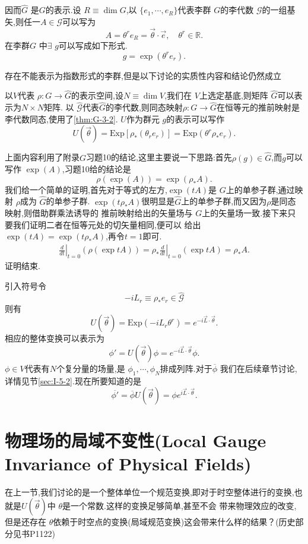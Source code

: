 \documentclass[../main.tex]{subfiles}
\begin{document}
 因而$\hat{G}$ 是$G$的表示.设 $R \equiv \dim{G}$,以 $\{e_1, \cdots ,e_R\}$代表李群 $G$的李代数 $\mathscr{G}$的一组基矢,则任一$A \in \mathscr{G}$可以写为
 \[
   A = \theta^r e_R = \vec{\theta}\cdot \vec{e}, \quad \theta^r \in \mathbb{R} 
 .\] 
 在李群$G$ 中$\exists $ $g$可以写成如下形式.
 \[
   g = \exp{(\theta^re_r)}
 .\]
 \begin{remark}
   存在不能表示为指数形式的李群,但是以下讨论的实质性内容和结论仍然成立
 \end{remark}
 以$V$代表 $\rho: G\to \hat{G}$的表示空间,设$N \equiv \dim{V}$,我们在 $V$上选定基底,则矩阵 $\hat{G}$可以表示为$N \times N$矩阵.
 以 $\hat{\mathscr{G}}$代表$\hat{G}$的李代数,则同态映射$\rho:G \to \hat{G}$在恒等元的推前映射是李代数同态,使用了\ref{thm:G-3-2}.
 $U$作为群元 $g$的表示可以写作 \[
   U(\vec{\theta}) = \text{Exp}[\rho_*(\theta_r e_r)] = \text{Exp}(\theta^r \rho_* e_r)
 .\] 
 \begin{note}
   上面内容利用了附录$G$习题10的结论,这里主要说一下思路:首先$\rho(g) \in \hat{G}$,而$g$可以写作 $\exp(A)$,习题10给的结论是\[
     \rho(\exp{(A)}) = \exp{(\rho_*A)}
   .\] 
   我们给一个简单的证明,首先对于等式的左方,$\exp{(tA)}$是 $G$上的单参子群,通过映射 $\rho$成为 $\hat{G}$的单参子群.
   $\exp{(t\rho_*A)}$很明显是$ \hat{G}$上的单参子群,而又因为$\rho$是同态映射,则借助群乘法诱导的
   推前映射给出的矢量场与 $G$上的矢量场一致.接下来只要我们证明二者在恒等元处的切矢量相同,便可以
   给出 $\exp{(tA)}=\exp{(t\rho_*A)}$,再令$t = 1$即可.
    \begin{align*}
      \left.\frac{d}{dt}\right|_{t = 0} (\rho(\exp{tA})) = \rho_* \left.\frac{d}{dt}\right|_{t = 0} (\exp{tA}) = \rho_* A 
   .\end{align*}
   证明结束.
 \end{note}
 引入符号令
 \begin{equation}
-i L_r \equiv \rho_* e_r \in \hat{\mathscr{G}} 
\label{eq:I-4-3}
 \end{equation}
  则有\[
 U(\vec{\theta}) = \text{Exp}(-iL_r \theta^r) = e^{-i \vec{L}\cdot \vec{\theta}} 
 .\] 
 相应的整体变换可以表示为\[
 \phi' = U(\vec{\theta})\phi = e^{-i \vec{L} \cdot \vec{\theta}}\phi
 .\] $\phi \in V$代表有$N$个复分量的场量,是 $\phi_1,\cdots,\phi_N$排成列阵.对于$\overline{\phi}$ 我们在后续章节讨论,详情见节\ref{sec:I-5-2}.现在所要知道的是\[
 \overline{\phi'} = \overline{\phi} U(\vec{\theta}) = \phi e^{i \vec{L} \cdot \vec{\theta}}
 .\] 
 \chapter{物理场的局域不变性(Local Gauge Invariance of Physical Fields)}
 在上一节,我们讨论的是一个整体单位一个规范变换,即对于时空整体进行的变换,也就是$U(\vec{\theta})$中 $\theta$是一个常数.这样的变换足够简单,甚至不会
 带来物理效应的改变,但是还存在 $\theta$依赖于时空点的变换(局域规范变换)这会带来什么样的结果？(历史部分见书P1122) 
\end{document}
